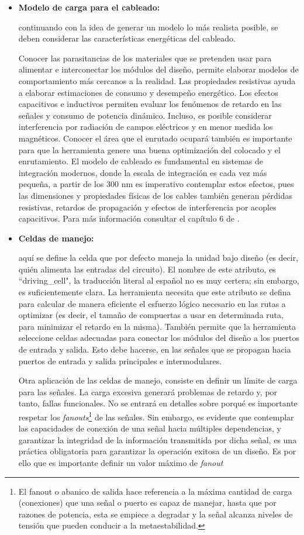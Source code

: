 \begin{itemize}
\item \textbf{Modelo de carga para el cableado:} {continuando con la idea de generar un modelo lo más realista posible, se deben considerar las características energéticas del cableado.

Conocer las parasitancias de los materiales que se pretenden usar para alimentar e interconectar los módulos del diseño, permite elaborar modelos de comportamiento más cercanos a la realidad. Las propiedades resistivas ayuda a elaborar estimaciones de consumo y desempeño energético. Los efectos capacitivos e inductivos permiten evaluar los fenómenos de retardo en las señales y consumo de potencia dinámico. Incluso, es posible considerar interferencia por radiación de campos eléctricos y en menor medida los magnéticos. Conocer el área que el enrutado ocupará también es importante para que la herramienta genere una buena optimización del colocado y el enrutamiento. El modelo de cableado es fundamental en sistemas de integración modernos, donde la escala de integración es cada vez más pequeña, a partir de los 300 nm es imperativo contemplar estos efectos, pues las dimensiones y propiedades físicas de los cables también generan pérdidas resistivas, retardos de propagación y efectos de interferencia por acoples capacitivos. Para más información consultar el capítulo 6 de \cite{book:weste2005}.}

\item \textbf{Celdas de manejo:} {aquí se define la celda que por defecto maneja la unidad bajo diseño (es decir, quién alimenta las entradas del circuito). El nombre de este atributo, es ``driving\_cell", la traducción literal al español no es muy certera; sin embargo, es suficientemente clara. La herramienta necesita que este atributo se defina para calcular de manera eficiente el esfuerzo lógico necesario en las rutas a optimizar (es decir, el tamaño de compuertas a usar en determinada ruta, para minimizar el retardo en la misma). También permite que la herramienta seleccione celdas adecuadas para conectar los módulos del diseño a los puertos de entrada y salida. Esto debe hacerse, en las señales que se propagan hacia puertos de entrada y salida principales e intermodulares.

Otra aplicación de las celdas de manejo, consiste en definir un límite de carga para las señales. La carga excesiva generará problemas de retardo y, por tanto, fallas funcionales. No se entrará en detalles sobre porqué es importante respetar los \textit{fanouts}\footnote{El fanout o abanico de salida hace referencia a la máxima cantidad de carga (conexiones) que una señal o puerto es capaz de manejar, hasta que por razones de potencia, esta se empiece a degradar y la señal alcanza niveles de tensión que pueden conducir a la metaestabilidad.} de las señales. Sin embargo, es evidente que contemplar las capacidades de conexión de una señal hacia múltiples dependencias, y garantizar la integridad de la información transmitida por dicha señal, es una práctica obligatoria para garantizar la operación exitosa de un diseño. Es por ello que es importante definir un valor máximo de \textit{fanout}}


\end{itemize}
